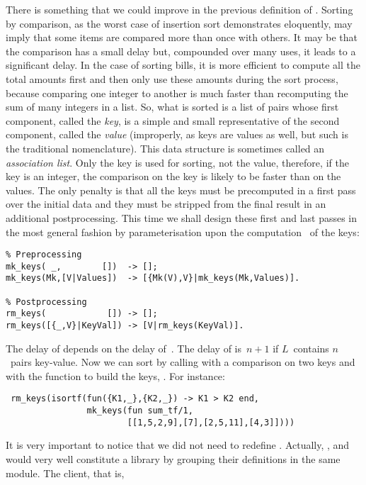There is something that we could improve in the previous definition of
. Sorting by comparison, as the worst case of
insertion sort demonstrates eloquently, may imply that some items are
compared more than once with others. It may be that the comparison has
a small delay but, compounded over many uses, it leads to a
significant delay. In the case of sorting bills, it is more efficient
to compute all the total amounts first and then only use these amounts
during the sort process, because comparing one integer to another is
much faster than recomputing the sum of many integers in a list. So,
what is sorted is a list of pairs whose first component, called the
\emph{key}, is a simple and small representative of the second
component, called the \emph{value} (improperly, as keys are \Erlang
values as well, but such is the traditional nomenclature). This data
structure is sometimes called an \emph{association list}. Only the key
is used for sorting, not the value, therefore, if the key is an
integer, the comparison on the key is likely to be faster than on the
values. The only penalty is that all the keys must be precomputed in a
first pass over the initial data and they must be stripped from the
final result in an additional post\-processing. This time we shall
design these first and last passes in the most general fashion by
parameterisation upon the computation~ of the keys:
\begin{verbatim}
% Preprocessing
mk_keys( _,        [])  -> [];
mk_keys(Mk,[V|Values])  -> [{Mk(V),V}|mk_keys(Mk,Values)].

% Postprocessing
rm_keys(            []) -> [];
rm_keys([{_,V}|KeyVal]) -> [V|rm_keys(KeyVal)].
\end{verbatim}
The delay of  depends on the delay
of~. The delay of  is~\(n+1\) if
\(L\)~contains \(n\)~pairs key\hyp{}value. Now we can sort by calling
 with a comparison on two keys and with the function
to build the keys, . For instance:
\begin{verbatim}
 rm_keys(isortf(fun({K1,_},{K2,_}) -> K1 > K2 end,
                mk_keys(fun sum_tf/1,
                        [[1,5,2,9],[7],[2,5,11],[4,3]])))
\end{verbatim}
It is very important to notice that we did not need to redefine
. Actually, , 
and  would very well constitute a library by
grouping their definitions in the same module. The client, that is,
